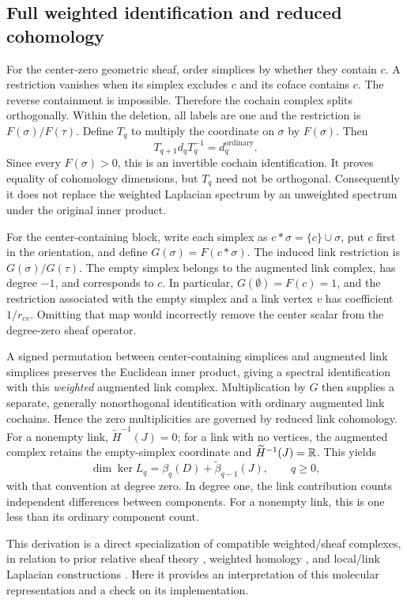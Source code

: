 \subsection{Full weighted identification and reduced cohomology}
\label{sec:link_details}
For the center-zero geometric sheaf, order simplices by whether they contain $c$. A restriction vanishes when its simplex excludes $c$ and its coface contains $c$. The reverse containment is impossible. Therefore the cochain complex splits orthogonally. Within the deletion, all labels are one and the restriction is $F(\sigma)/F(\tau)$. Define $T_q$ to multiply the coordinate on $\sigma$ by $F(\sigma)$. Then
\begin{equation}
T_{q+1}d_qT_q^{-1}=d_q^{\mathrm{ordinary}}.
\end{equation}
Since every $F(\sigma)>0$, this is an invertible cochain identification. It proves equality of cohomology dimensions, but $T_q$ need not be orthogonal. Consequently it does not replace the weighted Laplacian spectrum by an unweighted spectrum under the original inner product.

For the center-containing block, write each simplex as $c*\sigma=\{c\}\cup\sigma$, put $c$ first in the orientation, and define $G(\sigma)=F(c*\sigma)$. The induced link restriction is $G(\sigma)/G(\tau)$. The empty simplex belongs to the augmented link complex, has degree $-1$, and corresponds to $c$. In particular, $G(\emptyset)=F(c)=1$, and the restriction associated with the empty simplex and a link vertex $v$ has coefficient $1/r_{cv}$. Omitting that map would incorrectly remove the center scalar from the degree-zero sheaf operator.

A signed permutation between center-containing simplices and augmented link simplices preserves the Euclidean inner product, giving a spectral identification with this \emph{weighted} augmented link complex. Multiplication by $G$ then supplies a separate, generally nonorthogonal identification with ordinary augmented link cochains. Hence the zero multiplicities are governed by reduced link cohomology. For a nonempty link, $\widetilde H^{-1}(J)=0$; for a link with no vertices, the augmented complex retains the empty-simplex coordinate and $\widetilde H^{-1}(J)=\mathbb{R}$. This yields
\begin{equation}
\dim\ker L_q=\beta_q(D)+\widetilde\beta_{q-1}(J),\qquad q\geq0,
\end{equation}
with that convention at degree zero. In degree one, the link contribution counts independent differences between components. For a nonempty link, this is one less than its ordinary component count.

This derivation is a direct specialization of compatible weighted/sheaf complexes, in relation to prior relative sheaf theory \citep{hansen2019}, weighted homology \citep{renwu2021}, and local/link Laplacian constructions \citep{liu2026}. Here it provides an interpretation of this molecular representation and a check on its implementation.

